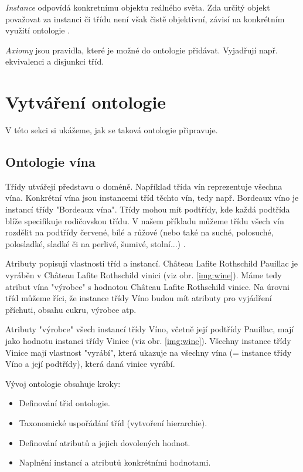 \textit{Instance} odpovídá konkretnímu objektu reálného světa. Zda určitý objekt považovat za instanci či třídu není však čistě objektivní, závisí na konkrétním využití ontologie \cite{ontowww}.

\textit{Axiomy} jsou pravidla, které je možné do ontologie přidávat. Vyjadřují např. ekvivalenci a disjunkci tříd.

\section{Vytváření ontologie}

V této sekci si ukážeme, jak se taková ontologie připravuje.

\subsection{Ontologie vína}

Třídy utvářejí představu o doméně. Například třída vín reprezentuje všechna vína.
Konkrétní vína jsou instancemi tříd těchto vín, tedy např. Bordeaux víno je instancí třídy "Bordeaux vína".
Třídy mohou mít podtřídy, kde každá podtřída blíže specifikuje rodičovskou třídu.
V našem příkladu můžeme třídu všech vín rozdělit na podtřídy červené, bílé a růžové (nebo také na suché, polosuché, polosladké, sladké či na perlivé, šumivé, stolní...) \cite {noy}.

Atributy popisují vlastnosti tříd a instancí. Château Lafite Rothschild Pauillac je vyráběn v Château Lafite Rothschild vinici (viz obr. \ref{img:wine}).
Máme tedy atribut vína "výrobce" s hodnotou Château Lafite Rothschild vinice.
Na úrovni tříd můžeme říci, že instance třídy Víno budou mít atributy pro vyjádření příchuti, obsahu cukru, výrobce atp. 

Atributy "výrobce" všech instancí třídy Víno, včetně její podtřídy Pauillac, mají jako hodnotu instanci třídy Vinice (viz obr. \ref{img:wine}).
Všechny instance třídy Vinice mají vlastnost "vyrábí", která ukazuje na všechny vína (= instance třídy Víno a její podtřídy), která daná vinice vyrábí.

Vývoj ontologie obsahuje kroky:

\begin{itemize}
\item Definování třid ontologie.
\item Taxonomické uspořádání tříd (vytvoření hierarchie).
\item Definování atributů a jejich dovolených hodnot.
\item Naplnění instancí a atributů konkrétními hodnotami.
\end{itemize}

